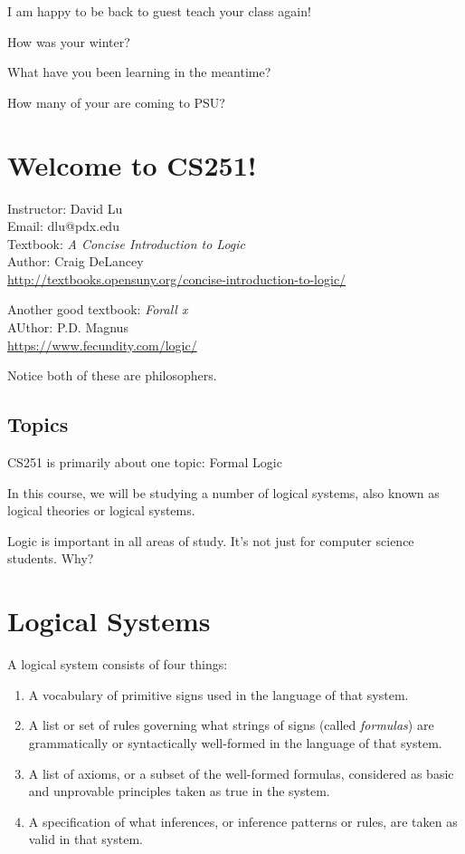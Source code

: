 \documentclass[
paper=128mm:96mm, %
fontsize=11pt, %
pagesize, %
parskip=half-, %
]{scrartcl} %
\theoremstyle{mythmstyle} %
\begin{document}
I am happy to be back to guest teach your class again!

How was your winter?

What have you been learning in the meantime?

How many of your are coming to PSU?

\clearpage

\section{Welcome to CS251!}

Instructor: David Lu \\
Email: dlu@pdx.edu\\
Textbook: \textit{A Concise Introduction to Logic} \\
Author: Craig DeLancey\\
\url{http://textbooks.opensuny.org/concise-introduction-to-logic/} 

Another good textbook: \textit{Forall x}\\
AUthor: P.D. Magnus \\
\url{https://www.fecundity.com/logic/}

Notice both of these are philosophers.

\clearpage


\subsection{Topics}

CS251 is primarily about one topic: Formal Logic

In this course, we will be studying a number of logical systems, also known
as logical theories or logical systems.  

Logic is important in all areas of study. It's not just for computer science students. Why?



\clearpage

\section{Logical Systems}

A logical system consists of four things: 
\begin{enumerate}
	\item A vocabulary of primitive signs used in the language of that system.
	\item A list or set of rules governing what strings of signs (called \textit{formulas})
	are grammatically or syntactically well-formed in the language
	of that system.
	\item A list of axioms, or a subset of the well-formed formulas, considered
	as basic and unprovable principles taken as true in the system.
	\item A specification of what inferences, or inference patterns or rules,
	are taken as valid in that system.
\end{enumerate}
\end{document}

